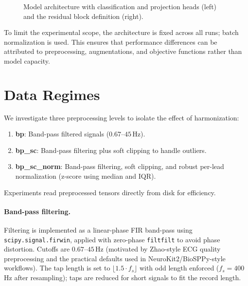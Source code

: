 \begin{figure}[htbp]
{
  }%
  \caption[Model architecture]{Model architecture with classification and projection heads (left) and the residual block definition (right).}
  \label{fig:model_arch}
\end{figure}

To limit the experimental scope, the architecture is fixed across all runs; batch normalization is used. This ensures that performance differences can be attributed to preprocessing, augmentations, and objective functions rather than model capacity.

\section{Data Regimes}
\label{sec:data_regimes}
We investigate three preprocessing levels to isolate the effect of harmonization:
\begin{enumerate}
  \item \textbf{bp}: Band-pass filtered signals ($0.67$--$45$\,Hz).
  \item \textbf{bp\_sc}: Band-pass filtering plus soft clipping to handle outliers.
  \item \textbf{bp\_sc\_norm}: Band-pass filtering, soft clipping, and robust per-lead normalization (z-score using median and IQR).
\end{enumerate}
Experiments read preprocessed tensors directly from disk for efficiency.

\paragraph{Band-pass filtering.}
Filtering is implemented as a linear-phase FIR band-pass using \texttt{scipy.signal.firwin}, applied with zero-phase \texttt{filtfilt} to avoid phase distortion.
Cutoffs are $0.67$--$45$\,Hz (motivated by Zhao-style ECG quality preprocessing and the practical defaults used in NeuroKit2/BioSPPy-style workflows).
The tap length is set to $\lfloor 1.5 \cdot f_s \rfloor$ with odd length enforced ($f_s=400$\,Hz after resampling); taps are reduced for short signals to fit the record length.

